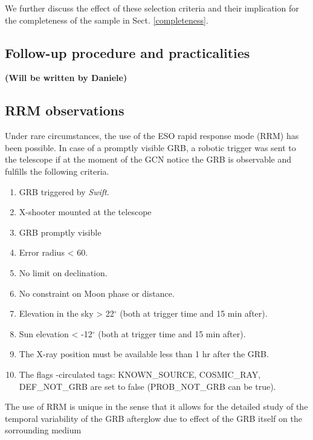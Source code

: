 \documentclass{aa}    %
\newcommand\todo[1]{\textbf{(#1)}}
\begin{document}
We further discuss the effect of these selection criteria and their implication
for the completeness of the sample in Sect. \ref{completeness}.

\subsection{Follow-up procedure and practicalities}

\todo{Will be written by Daniele}



\subsection{RRM observations} \label{RRM}

Under rare circumstances, the use of the ESO rapid response mode (RRM) has been
possible. In case of a promptly visible GRB, a robotic trigger was sent to the
telescope if at the moment of the GCN notice the GRB is observable and fulfills
the following criteria.


\begin{enumerate}
	\item GRB triggered by \textit{Swift}.
	\item X-shooter mounted at the telescope
	\item GRB promptly visible
	\item Error radius < 60\arcsec.
	\item No limit on declination. 
	\item No constraint on Moon phase or distance. 
	\item Elevation in the sky > 22$^\circ$ (both at trigger time and 15 min after).
	\item Sun elevation < -12$^\circ$ (both at trigger time and 15 min after).
	\item The X-ray position must be available less than 1 hr after the GRB.
	\item The flags \swift-circulated tags: KNOWN\_SOURCE, COSMIC\_RAY, DEF\_NOT\_GRB are set to false (PROB\_NOT\_GRB can be true).
\end{enumerate}

The use of RRM is unique in the sense that it allows for the detailed study of
the temporal variability of the GRB afterglow due to effect of the GRB itself on
the sorrounding medium \citep[e.g., see][for examples]{Dessauges-Zavadsky2006,
	Vreeswijk2007, Vreeswijk2013}
\end{document}
